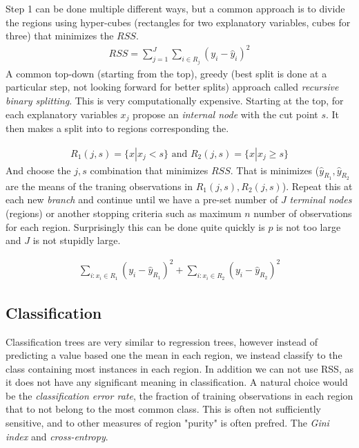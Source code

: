 \documentclass{article}
\begin{document}
Step 1 can be done multiple different ways, but a common approach is to divide the regions using hyper-cubes (rectangles for two explanatory variables, cubes for three) that minimizes the $RSS$.
\begin{align*}
    RSS = \sum_{j=1}^{J} \sum_{i \in R_j} (y_i - \hat{y}_i)^2
\end{align*}
A common top-down (starting from the top), greedy (best split is done at a particular step, not looking forward for better splits) approach called \textit{recursive binary splitting}. This is very computationally expensive. Starting at the top, for each explanatory variables $x_j$  propose an \textit{internal node} with the cut point $s$. It then makes a split into to regions corresponding the.

\begin{align*}
    R_1(j,s) = \{ x | x_j < s \} \text{ and } R_2(j,s) = \{ x | x_j \geq s \}
\end{align*}
And choose the $j,s$ combination that minimizes $RSS$. That is minimizes ($\hat{y}_{R_1}, \hat{y}_{R_2}$ are the means of the traning observations in $R_1(j,s), R_2(j,s)$). Repeat this at each new \textit{branch} and continue until we have a pre-set number of $J$ \textit{terminal nodes} (regions) or another stopping criteria such as maximum $n$ number of observations for each region. Surprisingly this can be done quite quickly is $p$ is not too large and $J$ is not stupidly large.

\begin{align*}
    \sum_{i: x_i \in R_1} (y_i -\hat{y}_{R_1})^2 + \sum_{i: x_i \in R_2} (y_i -\hat{y}_{R_2})^2 
\end{align*}

\subsection{Classification}
Classification trees are very similar to regression trees, however instead of predicting a value based one the mean in each region, we instead classify to the class containing most instances in each region. In addition we can not use RSS, as it does not have any significant meaning in classification. A natural choice would be the \textit{classification error rate}, the fraction of training observations in each region that to not belong to the most common class. This is often not sufficiently sensitive, and to other measures of region "purity" is often prefred. The \textit{Gini index} and \textit{cross-entropy}.
\end{document}
